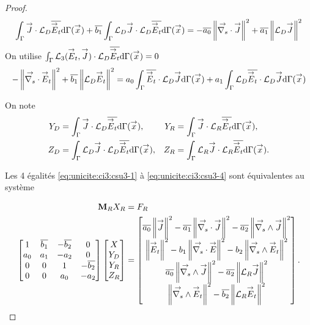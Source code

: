 \begin{proof}
    \begin{equation}
      \label{eq:unicite:ci3:csu3-5}
      \int_\Gamma \vJ \cdot \LD \conj{\vE_t}\dd{\Gamma}(\vx)   + \conj{b_1} \int_\Gamma \LD \vJ \cdot \LD \conj{\vE_t}\dd{\Gamma}(\vx)
      = - \conj{a_0} \norm{\vdivs \vJ}^2 + \conj{a_1} \norm{ \LD \vJ}^2 
    \end{equation}
    On utilise \(\int_\Gamma {\LL_3(\vE_t,\vJ)}\cdot\LD\conj{\vE_t}\dd{\Gamma}(\vx)=0\)
    \begin{equation}
      \label{eq:unicite:ci3:csu3-6}
      -\norm{ \vdivs \vE_t }^2   + \conj{b_1} \norm{ \LD \vE_t}^2
      = a_0 \int_\Gamma \conj{\vE_t} \cdot \LD \vJ\dd{\Gamma}(\vx)  + a_1 \int_\Gamma \LD \conj{\vE_t} \cdot \LD \vJ \dd{\Gamma}(\vx)
    \end{equation}

    On note
    \begin{align*}
      Y_D &= \int_\Gamma \vJ \cdot \LD \conj{\vE_t}\dd{\Gamma}(\vx),  &
      Y_R &= \int_\Gamma \vJ \cdot \LR \conj{\vE_t} \dd{\Gamma}(\vx),
      \\
      Z_D &= \int_\Gamma \LD \vJ \cdot \LD \conj{\vE_t}\dd{\Gamma}(\vx),  &
      Z_R &= \int_\Gamma \LR \vJ \cdot \LR \conj{\vE_t} \dd{\Gamma}(\vx).
    \end{align*}

    Les 4 égalités \eqref{eq:unicite:ci3:csu3-1} à \eqref{eq:unicite:ci3:csu3-4} sont équivalentes au système

    \begin{align*}
      \mM_R X_R &= F_R
      \\
      \begin{bmatrix}
        1 & \conj{b_1} & -\conj{b_2} & 0
        \\
        a_0 & a_1 & -a_2 & 0
        \\
        0 & 0 & 1 & -\conj{b_2}
        \\
        0 & 0 & a_0 & -a_2
        \\
      \end{bmatrix}
      \begin{bmatrix}
        X\\
        Y_D\\
        Y_R\\
        Z_R
      \end{bmatrix}
      &=
      \begin{bmatrix}
        \conj{a_0} \norm{\vJ}^2 - \conj{a_1} \norm{\vdivs \vJ}^2 - \conj{a_2} \norm{\vrots \vJ}^2
        \\
        \norm{\vE_t}^2  - b_1 \norm{\vdivs \vE}^2  - b_2 \norm{\vrots \vE_t}^2
        \\
        \conj{a_0} \norm{\vrots \vJ}^2 - \conj{a_2} \norm{\LR \vJ}^2
        \\
        \norm{\vrots \vE_t}^2 - \conj{b_2} \norm{\LR \vE_t}^2
      \end{bmatrix}.
    \end{align*}
    

\end{proof}
